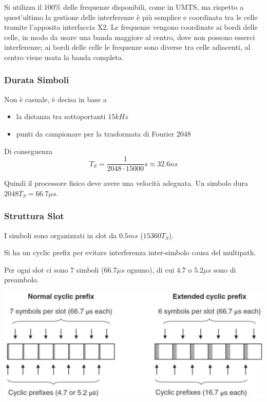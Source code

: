 Si utilizza il 100\% delle frequenze disponibili, come in UMTS, ma rispetto a quest'ultimo la gestione delle interferenze è più semplice e coordinata tra le celle tramite l’apposita interfaccia X2. Le frequenze vengono coordinate ai bordi delle celle, in modo da usare una banda maggiore al centro, dove non possono esserci interferenze; ai bordi delle celle le frequenze sono diverse tra celle adiacenti, al centro viene usata la banda completa.

\subsubsection{Durata Simboli}

Non è casuale, è decisa in base a
\begin{itemize}
	\item la distanza tra sottoportanti $15kHz$

	\item punti da campionare per la trasformata di Fourier $2048$
\end{itemize}

Di conseguenza
$$ T_S = \frac{1}{2048 \cdot 15000}s \approx 32.6 ns $$

Quindi il processore fisico deve avere una velocità adeguata. Un simbolo dura $2048 T_S = 66.7 \mu s$.

\subsubsection{Struttura Slot}

I simboli sono organizzati in slot da $0.5ms$ ($15360 T_S$).

Si ha un cyclic prefix per evitare interferenza inter-simbolo causa del multipath. 

Per ogni slot ci sono 7 simboli ($66.7 \mu s$ ognuno), di cui $4.7$ o $5.2 \mu s$ sono di preambolo.

\begin{center}
	\includegraphics[width=0.85\linewidth]{img/4g/cycprefix}
\end{center}

